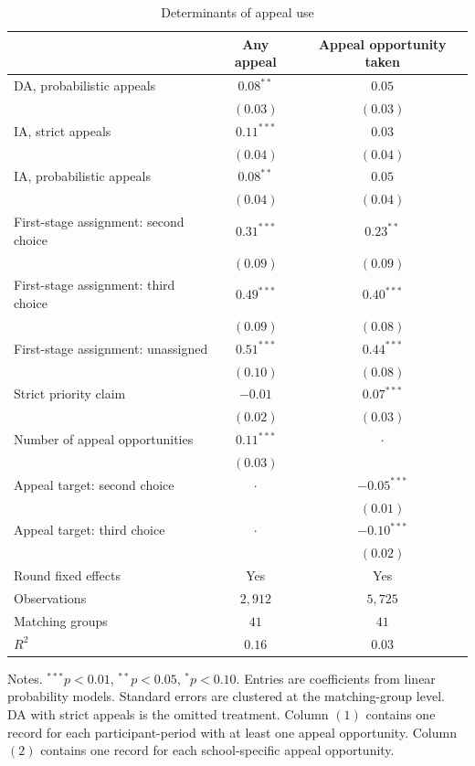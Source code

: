 \begin{table}[htbp]
\centering
\caption{Determinants of appeal use}
\label{tab:appeal_use_rep}
\begin{threeparttable}
\begin{tabular*}{\textwidth}{@{\extracolsep{\fill}} lcc @{}}
\toprule
& Any appeal & Appeal opportunity taken \\
\midrule
DA, probabilistic appeals & \(0.08^{**}\) & \(0.05\) \\
& \((0.03)\) & \((0.03)\) \\
IA, strict appeals & \(0.11^{***}\) & \(0.03\) \\
& \((0.04)\) & \((0.04)\) \\
IA, probabilistic appeals & \(0.08^{**}\) & \(0.05\) \\
& \((0.04)\) & \((0.04)\) \\
\addlinespace
First-stage assignment: second choice & \(0.31^{***}\) & \(0.23^{**}\) \\
& \((0.09)\) & \((0.09)\) \\
First-stage assignment: third choice & \(0.49^{***}\) & \(0.40^{***}\) \\
& \((0.09)\) & \((0.08)\) \\
First-stage assignment: unassigned & \(0.51^{***}\) & \(0.44^{***}\) \\
& \((0.10)\) & \((0.08)\) \\
Strict priority claim & \(-0.01\) & \(0.07^{***}\) \\
& \((0.02)\) & \((0.03)\) \\
Number of appeal opportunities & \(0.11^{***}\) & \(\cdot\) \\
& \((0.03)\) &  \\
Appeal target: second choice & \(\cdot\) & \(-0.05^{***}\) \\
&  & \((0.01)\) \\
Appeal target: third choice & \(\cdot\) & \(-0.10^{***}\) \\
&  & \((0.02)\) \\
\midrule
Round fixed effects & Yes & Yes \\
Observations & \(2{,}912\) & \(5{,}725\) \\
Matching groups & \(41\) & \(41\) \\
\(R^2\) & \(0.16\) & \(0.03\) \\
\bottomrule
\end{tabular*}
\begin{tablenotes}[flushleft]\footnotesize
\item Notes. \(^{***}p<0.01\), \(^{**}p<0.05\), \(^{*}p<0.10\). Entries are coefficients from linear probability models. Standard errors are clustered at the matching-group level. DA with strict appeals is the omitted treatment. Column \((1)\) contains one record for each participant-period with at least one appeal opportunity. Column \((2)\) contains one record for each school-specific appeal opportunity.
\end{tablenotes}
\end{threeparttable}
\end{table}
